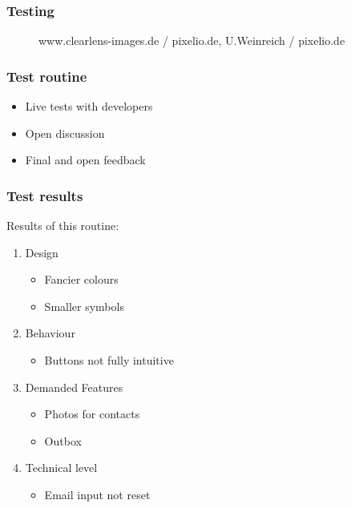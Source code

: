 \documentclass[9pt]{beamer}
\begin{document}
			\begin{frame}
				\frametitle{Testing}
				\begin{figure}
					\centering
					\caption{www.clearlens-images.de  / pixelio.de, U.Weinreich  / pixelio.de}
				\end{figure}
			\end{frame}
			
			\begin{frame}
				\frametitle{Test routine}
				\begin{itemize}
					\item Live tests with developers
					\item Open discussion
					\item Final and open feedback
				\end{itemize}
			\end{frame}
			
			\begin{frame}
				\frametitle{Test results}
				Results of this routine:
				\begin{enumerate}
					\item Design
					\begin{itemize}
						\item Fancier colours
						\item Smaller symbols
					\end{itemize}
					\item Behaviour
					\begin{itemize}
						\item Buttons not fully intuitive
					\end{itemize}
					\item Demanded Features
					\begin{itemize}
						\item Photos for contacts
						\item Outbox
					\end{itemize}
					\item Technical level
					\begin{itemize}
						\item Email input not reset
					\end{itemize}
				\end{enumerate}
			\end{frame}
			
\end{document}
